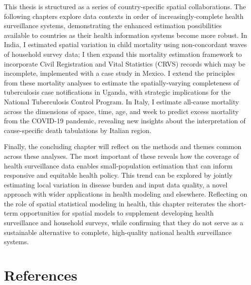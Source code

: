 \documentclass[
]{article}
\begin{document}
This thesis is structured as a series of country-specific spatial collaborations. The following chapters explore data contexts in order of increasingly-complete health surveillance systems, demonstrating the enhanced estimation possibilities available to countries as their health information systems become more robust. In India, I estimated spatial variation in child mortality using non-concordant waves of household survey data; I then expand this mortality estimation framework to incorporate Civil Registration and Vital Statistics (CRVS) records which may be incomplete, implemented with a case study in Mexico. I extend the principles from these mortality analyses to estimate the spatially-varying completeness of tuberculosis case notifications in Uganda, with strategic implications for the National Tuberculosis Control Program. In Italy, I estimate all-cause mortality across the dimensions of space, time, age, and week to predict excess mortality from the COVID-19 pandemic, revealing new insights about the interpretation of cause-specific death tabulations by Italian region.

Finally, the concluding chapter will reflect on the methods and themes common across these analyses. The most important of these reveals how the coverage of health surveillance data enables small-population estimation that can inform responsive and equitable health policy. This trend can be explored by jointly estimating local variation in disease burden and input data quality, a novel approach with wider applications in health modeling and elsewhere. Reflecting on the role of spatial statistical modeling in health, this chapter reiterates the short-term opportunities for spatial models to supplement developing health surveillance and household surveys, while confirming that they do not serve as a sustainable alternative to complete, high-quality national health surveillance systems.

\hypertarget{references}{%
\section{References}\label{references}}
\end{document}
